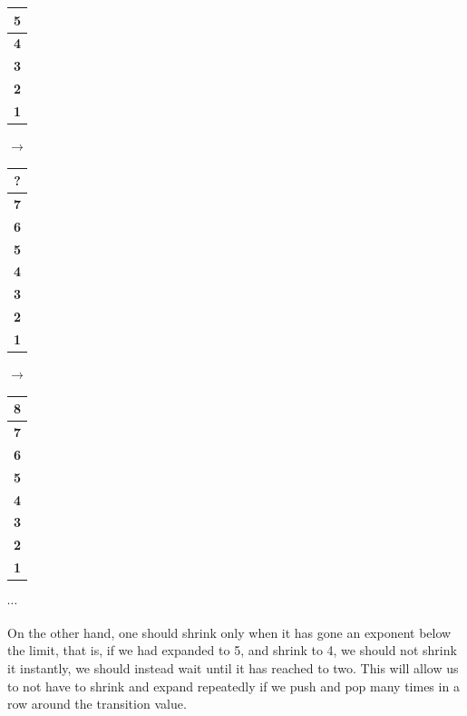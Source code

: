 \documentclass[nobib]{tufte-handout}
\begin{document}
\begin{table}
\begin{tabular}[b]{|c|}
        \hline
        \textbf{5} \\
        \hline
        \textbf{4} \\
        \hline
        \textbf{3} \\
        \hline
        \textbf{2} \\
        \hline
        \textbf{1} \\
        \hline
    \end{tabular}
    $\rightarrow$
    \begin{tabular}[b]{|c|}
        \hline
        \textbf{?} \\
        \hline
        \textbf{7} \\
        \hline
        \textbf{6} \\
        \hline
        \textbf{5} \\
        \hline
        \textbf{4} \\
        \hline
        \textbf{3} \\
        \hline
        \textbf{2} \\
        \hline
        \textbf{1} \\
        \hline
    \end{tabular}
    $\rightarrow$
    \begin{tabular}[b]{|c|}
        \hline
        \textbf{8} \\
        \hline
        \textbf{7} \\
        \hline
        \textbf{6} \\
        \hline
        \textbf{5} \\
        \hline
        \textbf{4} \\
        \hline
        \textbf{3} \\
        \hline
        \textbf{2} \\
        \hline
        \textbf{1} \\
        \hline
    \end{tabular}
    $\cdots$
\end{table}
On the other hand, one should shrink only when it has gone an exponent below the limit, that is, if we had expanded to 5, and shrink to 4, we should not shrink it instantly, we should instead wait until it has reached to two. This will allow us to not have to shrink and expand repeatedly if we push and pop many times in a row around the transition value.\\
\end{document}
